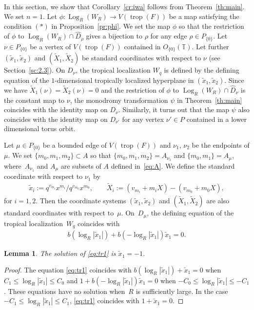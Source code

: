 \documentclass[10pt,a4paper]{amsart}
\numberwithin{equation}{section}
\newtheorem{Lemma}[Theorem]{Lemma}
\begin{document}
In this section, we show that Corollary~\ref{cr:iwa} follows from Theorem~\ref{th:main}. We set $n=1$. Let $\phi \colon \operatorname{Log}_R(W_R) \to V(\operatorname{trop}(F))$ be a map satisfying the condition $(\ast)$ in Proposition~\ref{pr:phi}. We set the map $\phi$ so that the restriction of $\phi$ to $\operatorname{Log}_R(W_R) \cap \widehat{D}_\rho$ gives a bijection to $\rho$ for any edge $\rho \in P_{\{0\}}$. Let $\nu \in P_{\{0\}}$ be a vertex of $V(\operatorname{trop}(F))$ contained in $O_{\{0\}}({\mathbb T})$. Let further $(\tilde{x}_1,\tilde{x}_2)$ and $(\widetilde{X}_1, \widetilde{X}_2)$ be standard coordinates with respect to $\nu$ (see Section~\ref{sc:2.3}). On $D_\nu$, the tropical localization $W_q$ is def\/ined by the def\/ining equation of the $1$-dimensional tropically localized hyperplane in $(\tilde{x}_1, \tilde{x}_2)$. Since we have $\widetilde{X}_1(\nu)=\widetilde{X}_2(\nu)=0$ and the restriction of $\phi$ to $\operatorname{Log}_R(W_R) \cap \widehat{D}_\nu$ is the constant map to $\nu$, the monodromy transformation $\psi$ in Theorem~\ref{th:main} coincides with the identity map on $D_\nu$. Similarly, it turns out that the map $\psi$ also coincides with the identity map on $D_{\nu'}$ for any vertex $\nu' \in P$ contained in a lower dimensional torus orbit.

Let $\mu \in P_{\{0\}}$ be a bounded edge of $V(\operatorname{trop}(F))$ and $\nu_1$, $\nu_2$ be the endpoints of $\mu$. We set $\{m_0, m_1, m_2\} \subset A$ so that $\{m_0, m_1, m_2\}=A_{\nu_1}$ and $\{m_0, m_1\}=A_\mu$, where~$A_{\nu_1}$ and $A_{\mu}$ are subsets of $A$ def\/ined in~\eqref{eq:A}. We def\/ine the standard coordinate with respect to $\nu_1$ by
\begin{gather*}
\tilde{x}_i :=q^{v_{m_i}}x^{m_i} / q^{v_{m_0}}x^{m_0}, \qquad \widetilde{X}_i:=(v_{m_i}+m_iX)-(v_{m_0}+m_0X),
\end{gather*}
for $i=1,2$. Then the coordinate systems $(\tilde{x}_1,\tilde{x}_2)$ and $(\widetilde{X}_1, \widetilde{X}_2)$ are also standard coordinates with respect to~$\mu$. On~$D_\mu$, the def\/ining equation of the tropical localization~$W_q$ coincides with
\begin{gather}\label{eq:tr1}
b(\log_R|\tilde{x}_1|)+b(-\log_R|\tilde{x}_1|)\tilde{x}_1=0.
\end{gather}

\begin{Lemma} The solution of \eqref{eq:tr1} is $\tilde{x}_1=-1$.
\end{Lemma}
\begin{proof}The equation \eqref{eq:tr1} coincides with $b(\log_R|\tilde{x}_1|)+\tilde{x}_1=0$ when $C_1 \leq \log_R|\tilde{x}_1| \leq C_0$ and $1+b(-\log_R|\tilde{x}_1|)\tilde{x}_1=0$ when $-C_0 \leq \log_R|\tilde{x}_1| \leq -C_1$. These equations have no solution when~$R$ is suf\/f\/iciently large.
In the case $-C_1 \leq \log_R|\tilde{x}_1| \leq C_1$, \eqref{eq:tr1} coincides with $1+\tilde{x}_1=0$.
\end{proof}
\end{document}
